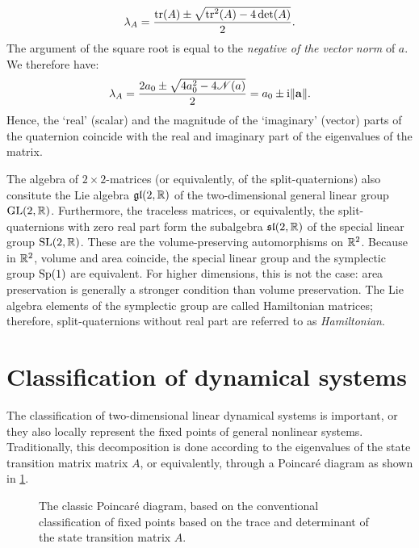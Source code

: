 \begin{itemize}
        $$ \lambda_A = \frac{\trace(A) \pm \sqrt{\trace^2(A) - 4\det(A)}}{2}.$$
        The argument of the square root is equal to the \emph{negative of the vector norm} of $a$. We therefore have:
        \begin{equation}
            \lambda_A = \frac{2a_0 \pm \sqrt{4 a_0^2 - 4\mathscr{N}(a)}}{2} = a_0 \pm \mathrm{i}\norm{\vb{a}}. 
            \label{eq:quat_eigvals}
        \end{equation}
        Hence, the `real' (scalar) and the magnitude of the `imaginary' (vector) parts of the quaternion coincide with the real and imaginary part of the eigenvalues of the matrix.
\end{itemize}

The algebra of $2\times2$-matrices (or equivalently, of the split-quaternions) also consitute the Lie algebra $\mathfrak{gl}(2, \mathbb{R})$ of the two-dimensional general linear group $\mathrm{GL}(2, \mathbb{R})$. Furthermore, the traceless matrices, or equivalently, the split-quaternions with zero real part form the subalgebra $\mathfrak{sl}(2, \mathbb{R})$ of the special linear group $\mathrm{SL}(2, \mathbb{R})$. These are the volume-preserving automorphisms on $\mathbb{R}^2$. Because in $\mathbb{R}^2$, volume and area coincide, the special linear group and the symplectic group $\mathrm{Sp}(1)$ are equivalent. For higher dimensions, this is not the case: area preservation is generally a stronger condition than volume preservation. The Lie algebra elements of the symplectic group are called Hamiltonian matrices; therefore, split-quaternions without real part are referred to as \emph{Hamiltonian}.

\section{Classification of dynamical systems}
\label{sec:system_classification}
The classification of two-dimensional linear dynamical systems is important, or they also locally represent the fixed points of general nonlinear systems. Traditionally, this decomposition is done according to the eigenvalues of the state transition matrix matrix $A$, or equivalently, through a Poincaré diagram as shown in \cref{fig:poincare_diagram}.
\begin{figure}[h!]
    \centering
    
    \caption{The classic Poincaré diagram, based on the conventional classification of fixed points based on the trace and determinant of the state transition matrix $A$.}
    \label{fig:poincare_diagram}
\end{figure}

